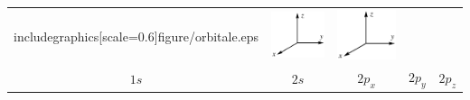 \begin{center}
\begin{tabular}{ccccc}
includegraphics[scale=0.6]{figure/orbitale.eps} & \includegraphics[scale=0.6]{figure/repere_orbitale.eps} & \includegraphics[scale=0.6]{figure/repere_orbitale.eps} \\
$1s$ & $2s$ & $2p_x$ & $2p_y$ & $2p_z$
\end{tabular}
\end{center}

